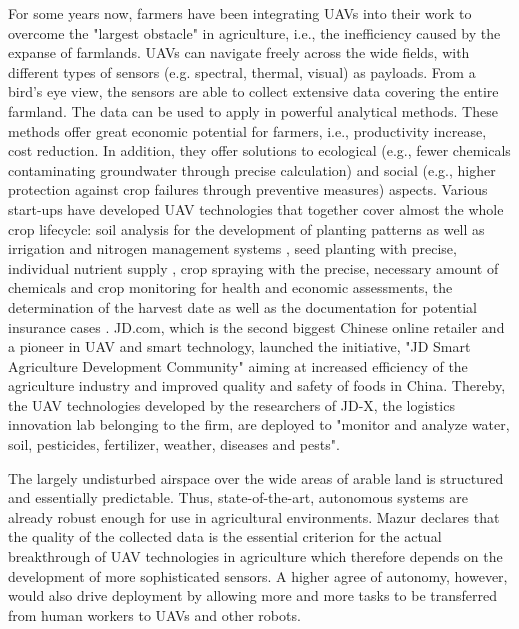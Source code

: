 For some years now, farmers have been integrating UAVs into their work to overcome the "largest obstacle" in agriculture, 
i.e., the inefficiency caused by the expanse of farmlands.
UAVs can navigate freely across the wide fields, with different types of sensors (e.g. spectral, thermal, visual) as payloads.
From a bird's eye view, the sensors are able to collect extensive data covering the entire farmland.
The data can be used to apply in powerful analytical methods.
These methods offer great economic potential for farmers, i.e., productivity increase, cost reduction.
In addition, they offer solutions to ecological (e.g., fewer chemicals contaminating groundwater through precise calculation) and 
social (e.g., higher protection against crop failures through preventive measures) aspects.
Various start-ups have developed UAV technologies that together cover almost the whole crop lifecycle:
soil analysis for the development of planting patterns as well as irrigation and nitrogen management systems \cite{DeveronUAS},
seed planting with precise, individual nutrient supply \cite{DroneSeed}, 
crop spraying with the precise, necessary amount of chemicals \cite{HSE} and
crop monitoring for health and economic assessments, the determination of the harvest date
as well as the documentation for potential insurance cases \cite{PrecisionHawk}.
JD.com, which is the second biggest Chinese online retailer and a pioneer in UAV and smart technology,
launched the initiative, "JD Smart Agriculture Development Community" \cite{JD.com2018} 
aiming at increased efficiency of the agriculture industry and improved quality and safety of foods in China.
Thereby, the UAV technologies developed by the researchers of JD-X, the logistics innovation lab belonging to the firm, 
are deployed to "monitor and analyze water, soil, pesticides, fertilizer, weather, diseases and pests".

The largely undisturbed airspace over the wide areas of arable land is structured and essentially predictable.
Thus, state-of-the-art, autonomous systems are already robust enough for use in agricultural environments.
Mazur \cite{Mazur2016} declares that the quality of the collected data is the essential criterion
for the actual breakthrough of UAV technologies in agriculture 
which therefore depends on the development of more sophisticated sensors.
A higher agree of autonomy, however, would also drive deployment 
by allowing more and more tasks to be transferred from human workers to UAVs and other robots.



